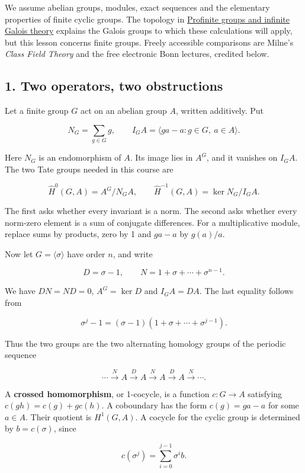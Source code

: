 \documentclass[11pt,a4paper]{article}
\begin{document}
We assume abelian groups, modules, exact sequences and the elementary
properties of finite cyclic groups. The topology in
\href{../profinite-groups-and-infinite-galois-theory.html}{Profinite
groups and infinite Galois theory} explains the Galois groups to which
these calculations will apply, but this lesson concerns finite groups.
Freely accessible comparisons are Milne's \emph{Class Field Theory} and
the free electronic Bonn lectures, credited below.

\subsection{1. Two operators, two
obstructions}\label{two-operators-two-obstructions}

Let a finite group \(G\) act on an abelian group \(A\), written
additively. Put

\[
N_G=\sum_{g\in G}g,
\qquad I_GA=\langle ga-a:g\in G,\ a\in A\rangle.
\]

Here \(N_G\) is an endomorphism of \(A\). Its image lies in \(A^G\), and
it vanishes on \(I_GA\). The two Tate groups needed in this course are

\[
\widehat H^0(G,A)=A^G/N_GA,
\qquad
\widehat H^{-1}(G,A)=\ker N_G/I_GA.
\]

The first asks whether every invariant is a norm. The second asks
whether every norm-zero element is a sum of conjugate differences. For a
multiplicative module, replace sums by products, zero by 1 and \(ga-a\)
by \(g(a)/a\).

Now let \(G=\langle\sigma\rangle\) have order \(n\), and write

\[
D=\sigma-1,
\qquad N=1+\sigma+\cdots+\sigma^{n-1}.
\]

We have \(DN=ND=0\), \(A^G=\ker D\) and \(I_GA=DA\). The last equality
follows from

\[
\sigma^j-1=(\sigma-1)(1+\sigma+\cdots+\sigma^{j-1}).
\]

Thus the two groups are the two alternating homology groups of the
periodic sequence

\[
\cdots\xrightarrow{N}A\xrightarrow{D}A\xrightarrow{N}A\xrightarrow{D}A\xrightarrow{N}\cdots.
\]

A \textbf{crossed homomorphism}, or 1-cocycle, is a function
\(c:G\to A\) satisfying \(c(gh)=c(g)+g c(h)\). A coboundary has the form
\(c(g)=ga-a\) for some \(a\in A\). Their quotient is \(H^1(G,A)\). A
cocycle for the cyclic group is determined by \(b=c(\sigma)\), since

\[
c(\sigma^j)=\sum_{i=0}^{j-1}\sigma^i b.
\]
\end{document}
